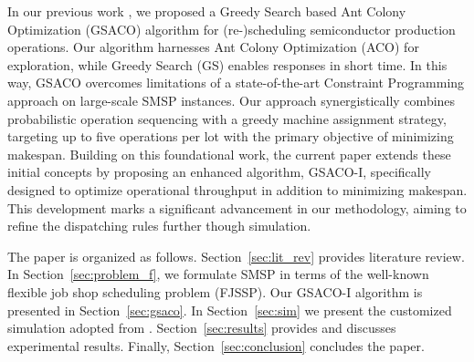 In our previous work \cite{Ali2024}, we proposed a Greedy Search based Ant Colony Optimization (GSACO)
algorithm for (re-)scheduling semiconductor production operations. 
Our algorithm harnesses Ant Colony Optimization (ACO) \cite{Dorigo2019} for exploration, while
Greedy Search (GS) \cite{Papadimitriou} enables responses in short time. 
In this way, GSACO overcomes limitations of a state-of-the-art Constraint Programming approach \cite{Perron2023}
on large-scale SMSP instances. Our approach synergistically combines probabilistic operation sequencing with a greedy machine assignment strategy, targeting up to five operations per lot with the primary objective of minimizing makespan. Building on this foundational work, the current paper extends these initial concepts by proposing an enhanced algorithm, GSACO-I, specifically designed to optimize operational throughput in addition to minimizing makespan. This development marks a significant advancement in our methodology, aiming to refine the dispatching rules further though simulation.

The paper is organized as follows. 
Section~\ref{sec:lit_rev} provides literature review.
In Section~\ref{sec:problem_f}, we formulate SMSP in terms of the well-known flexible job shop scheduling problem (FJSSP). 
Our GSACO-I algorithm is presented in Section~\ref{sec:gsaco}.
In Section~\ref{sec:sim} we present the customized simulation adopted from \cite{Kovács2022}.
Section~\ref{sec:results} provides and discusses experimental results.
Finally, Section~\ref{sec:conclusion} concludes the paper.




